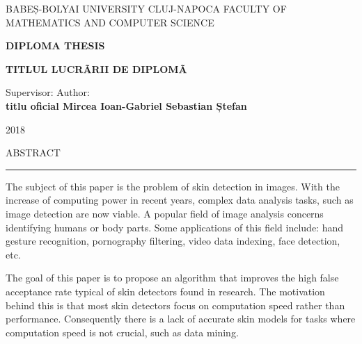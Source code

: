 \documentclass[12pt]{report}
\begin{document}
	
	\begin{titlepage}
		
		\begin{center}
			\Large{{BABEȘ-BOLYAI UNIVERSITY CLUJ-NAPOCA}}
			\newline
			\Large{{FACULTY OF MATHEMATICS AND COMPUTER SCIENCE}}
			
			\vspace{8cm}
			
			\textbf{DIPLOMA THESIS}
			
			\vspace{1cm}
			\Huge\textbf{{TITLUL LUCRÃRII DE DIPLOMÃ}}
			\fontsize{12}{14}
			
		\end{center}
		\vspace{6cm}
		
		\hspace*{0.8cm}Supervisor: \hfill  Author: \hspace*{0.8cm} \\    
		\textbf{titlu oficial Mircea Ioan-Gabriel \hfill  \textbf{Sebastian Ștefan}}
		
		\vspace{2cm}
		\begin{center}
			\Large{2018}
		\end{center}
	\end{titlepage}


	\cleardoublepage
	ABSTRACT
	\vspace{0.5cm}	
	\hrule
	\vspace{0.5cm}	
	
	The subject of this paper is the problem of skin detection in images. With the increase of computing power in recent years, complex data analysis tasks, such as image detection are now viable. A popular field of image analysis concerns identifying humans or body parts.  Some applications of this field include: hand gesture recognition, pornography filtering, video data indexing, face detection, etc. 
	
	The goal of this paper is to propose an algorithm that improves the high false acceptance rate typical of skin detectors found in research. The motivation behind this is that most skin detectors focus on computation speed rather than performance. Consequently there is a lack of accurate skin models for tasks where computation speed is not crucial, such as data mining.
	
\end{document}
